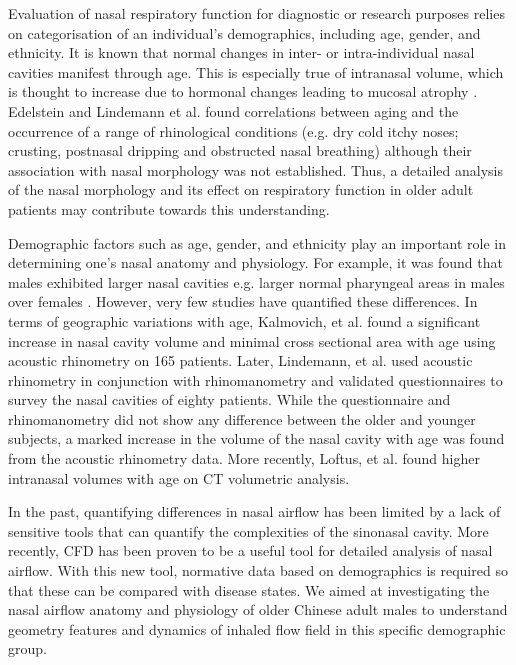 Evaluation of nasal respiratory function for diagnostic or research purposes relies on categorisation of an individual's demographics, including age, gender, and ethnicity. It is known that normal changes in inter- or intra-individual nasal cavities manifest through age. This is especially true of intranasal volume, which is thought to increase due to hormonal changes leading to mucosal atrophy \cite{Kalmovich2005, Lindemann2010}. Edelstein \cite{Edelstein1996}  and Lindemann et al. \cite{Lindemann2008}  found correlations between aging and the occurrence of a range of rhinological conditions (e.g. dry cold itchy noses; crusting, postnasal dripping and obstructed nasal breathing) although their association with nasal morphology was not established. Thus, a detailed analysis of the nasal morphology and its effect on respiratory function in older adult patients may contribute towards this understanding.

Demographic factors such as age, gender, and ethnicity play an important role in
determining one’s nasal anatomy and physiology. For example, it was found that males exhibited larger nasal cavities e.g. larger normal pharyngeal areas in males over females \cite{Huang1998, BROOKS1992}. However, very few studies have quantified these differences. In terms of geographic variations with age, Kalmovich, et al. \cite{Kalmovich2005} found a significant increase in nasal cavity volume and minimal cross sectional area with age using acoustic rhinometry on 165 patients. Later, Lindemann, et al. \cite{Lindemann2010} used acoustic rhinometry in conjunction with rhinomanometry and validated questionnaires to survey the nasal cavities of eighty patients. While the questionnaire and rhinomanometry did not show any difference between the older and younger subjects, a marked increase in the volume of the nasal cavity with age was found from the acoustic rhinometry data. More recently, Loftus, et al. \cite{Loftus2016}  found higher intranasal volumes with age on CT volumetric analysis.

In the past, quantifying differences in nasal airflow has been limited by a lack of sensitive tools that can quantify the complexities of the sinonasal cavity. More recently, CFD has been proven to be a useful tool for detailed analysis of nasal airflow. With this new tool, normative data based on demographics is required so that these can be compared with disease states. We aimed at investigating the nasal airflow anatomy and physiology of older Chinese adult males to understand geometry features and dynamics of inhaled flow field in this specific demographic group.

